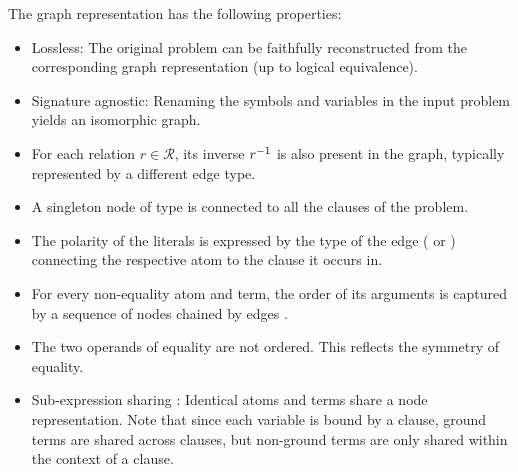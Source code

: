 The graph representation has the following properties:
\begin{itemize}
\item Lossless: The original problem can be faithfully reconstructed from the corresponding graph representation
(up to logical equivalence).
\item Signature agnostic: Renaming the symbols and variables in the input problem yields an isomorphic graph.
\item For each relation $r \in \mathcal{R}$, its inverse $r^{-1}$ is also present in the graph,
typically represented by a different edge type.
\item A singleton node of type  is connected to all the clauses of the problem.
\item The polarity of the literals is expressed by the type of the edge (\epos{} or \eneg{})
connecting the respective atom to the clause it occurs in.
\item For every non-equality atom and term, the order of its arguments is captured by a sequence of  nodes chained by edges \cite{Rawson2020}.
\item The two operands of equality are not ordered.
This reflects the symmetry of equality.
\item Sub-expression sharing \cite{Chvalovsky2019,Olsak2019,Rawson2020}:
Identical atoms and terms share a node representation.
Note that since each variable is bound by a clause,
ground terms are shared across clauses,
but non-ground terms are only shared within the context of a clause.
\end{itemize}

